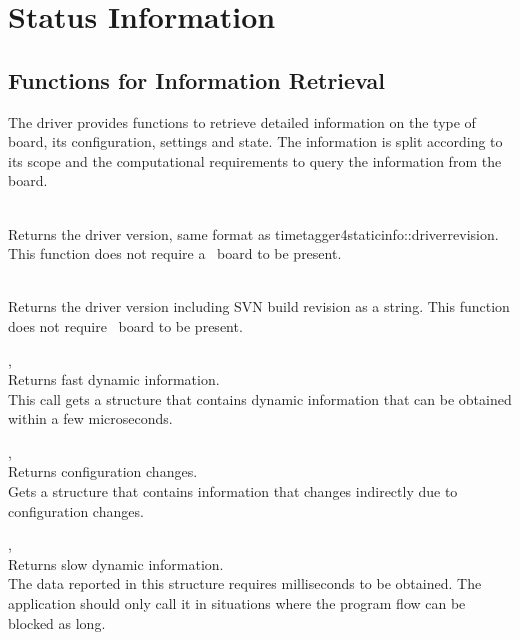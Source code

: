 	\section{Status Information}
		\subsection{Functions for Information Retrieval}

			The driver provides functions to retrieve detailed information on the type of board, its configuration, settings and state. The information is split according to its scope and the computational requirements to query the information from the board.

			\\
			Returns the driver version, same format as timetagger4\tu static\tu info::driver\tu revision. This function does not require a \deviceName\ board to be present.

			\\
			Returns the driver version including SVN build revision as a string. This function does not require \deviceName\ board to be present.

			, \\
			Returns fast dynamic information.\\
			This call gets a structure that contains dynamic information that can be obtained within a few microseconds.\par

			, \\
			Returns configuration changes.\\
			Gets a structure that contains information that changes indirectly due to configuration changes.\par

			, \\
			Returns slow dynamic information.\\
			The data reported in this structure requires milliseconds to be obtained. 
			The application should only call it in situations where the program flow can be blocked as long.\par

